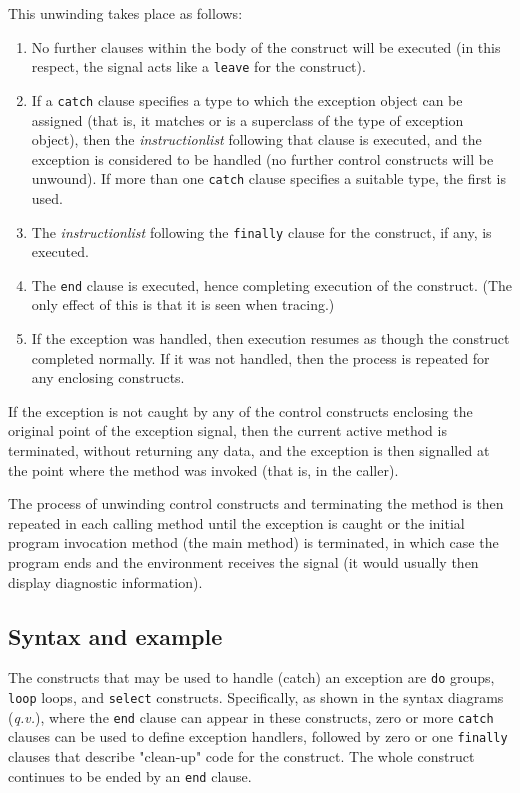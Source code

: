 This unwinding takes place as follows:
\begin{enumerate}
\item No further clauses within the body of the construct will be executed
(in this respect, the signal acts like a \texttt{leave} for the
construct).
\item If a \texttt{catch} clause specifies a type to which
the exception object can be assigned (that is, it matches or is a
superclass of the type of exception object), then the
\emph{instructionlist} following that clause is executed, and the
exception is considered to be handled (no further control constructs
will be unwound).
If more than one \texttt{catch} clause specifies a suitable type, the
first is used.
\item The \emph{instructionlist} following the \texttt{finally} clause
for the construct, if any, is executed.
\item The \texttt{end} clause is executed, hence completing execution of
the construct.
(The only effect of this is that it is seen when tracing.)
\item 
If the exception was handled, then execution resumes as though the
construct completed normally.  If it was not handled, then the process
is repeated for any enclosing constructs.
\end{enumerate}
 
If the exception is not caught by any of the control constructs
enclosing the original point of the exception signal, then
the current active method is terminated, without returning any data, and
the exception is then signalled at the point where the method was
invoked (that is, in the caller).
 
The process of unwinding control constructs and terminating the method
is then repeated in each calling method until the exception is caught or
the initial program invocation method (the main method) is terminated,
in which case the program ends and the environment receives the signal
(it would usually then display diagnostic information).
\subsection{Syntax and example}
 
The constructs that may be used to handle (catch) an exception are
\texttt{do} groups, \texttt{loop} loops, and \texttt{select} constructs.
Specifically, as shown in the syntax diagrams (\emph{q.v.}), where the
\texttt{end} clause can appear in these constructs, zero or more
\texttt{catch} clauses can be used to define exception handlers,
followed by zero or one \texttt{finally} clauses that describe
"clean-up" code for the construct.
The whole construct continues to be ended by an \texttt{end} clause.
 
